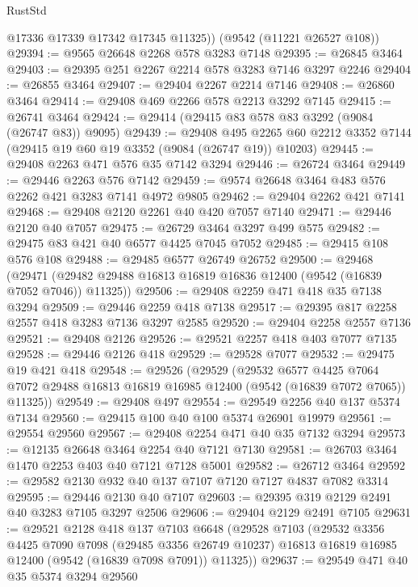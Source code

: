 \begin{lexlean}{RustStd}
\begin{coremodule}
        @17336
        @17339
        @17342
        @17345
        @11325))
    (@9542 (@11221 @26527 @108))
@29394 := @9565 @26648 @2268 @578 @3283 @7148
@29395 := @26845 @3464
@29403 := @29395 @251 @2267 @2214 @578 @3283 @7146 @3297 @2246
@29404 := @26855 @3464
@29407 := @29404 @2267 @2214 @7146
@29408 := @26860 @3464
@29414 := @29408 @469 @2266 @578 @2213 @3292 @7145
@29415 := @26741 @3464
@29424 := @29414 (@29415 @83 @578 @83 @3292 (@9084 (@26747 @83)) @9095)
@29439 := @29408
    @495
    @2265
    @60
    @2212
    @3352
    @7144
    (@29415 @19 @60 @19 @3352 (@9084 (@26747 @19)) @10203)
@29445 := @29408 @2263 @471 @576 @35 @7142 @3294
@29446 := @26724 @3464
@29449 := @29446 @2263 @576 @7142
@29459 := @9574 @26648 @3464 @483 @576 @2262 @421 @3283 @7141 @4972 @9805
@29462 := @29404 @2262 @421 @7141
@29468 := @29408 @2120 @2261 @40 @420 @7057 @7140
@29471 := @29446 @2120 @40 @7057
@29475 := @26729 @3464 @3297 @499 @575
@29482 := @29475 @83 @421 @40 @6577 @4425 @7045 @7052
@29485 := @29415 @108 @576 @108
@29488 := @29485 @6577 @26749 @26752
@29500 := @29468
    (@29471 (@29482 @29488 @16813 @16819 @16836 @12400 (@9542 (@16839 @7052 @7046)) @11325))
@29506 := @29408 @2259 @471 @418 @35 @7138 @3294
@29509 := @29446 @2259 @418 @7138
@29517 := @29395 @817 @2258 @2557 @418 @3283 @7136 @3297 @2585
@29520 := @29404 @2258 @2557 @7136
@29521 := @29408 @2126
@29526 := @29521 @2257 @418 @403 @7077 @7135
@29528 := @29446 @2126 @418
@29529 := @29528 @7077
@29532 := @29475 @19 @421 @418
@29548 := @29526
    (@29529
      (@29532
        @6577
        @4425
        @7064
        @7072
        @29488
        @16813
        @16819
        @16985
        @12400
        (@9542 (@16839 @7072 @7065))
        @11325))
@29549 := @29408 @497
@29554 := @29549 @2256 @40 @137 @5374 @7134
@29560 := @29415 @100 @40 @100 @5374 @26901 @19979
@29561 := @29554 @29560
@29567 := @29408 @2254 @471 @40 @35 @7132 @3294
@29573 := @12135 @26648 @3464 @2254 @40 @7121 @7130
@29581 := @26703 @3464 @1470 @2253 @403 @40 @7121 @7128 @5001
@29582 := @26712 @3464
@29592 := @29582 @2130 @932 @40 @137 @7107 @7120 @7127 @4837 @7082 @3314
@29595 := @29446 @2130 @40 @7107
@29603 := @29395 @319 @2129 @2491 @40 @3283 @7105 @3297 @2506
@29606 := @29404 @2129 @2491 @7105
@29631 := @29521
    @2128
    @418
    @137
    @7103
    @6648
    (@29528
      @7103
      (@29532
        @3356
        @4425
        @7090
        @7098
        (@29485 @3356 @26749 @10237)
        @16813
        @16819
        @16985
        @12400
        (@9542 (@16839 @7098 @7091))
        @11325))
@29637 := @29549 @471 @40 @35 @5374 @3294 @29560

\end{coremodule}
\end{lexlean}

